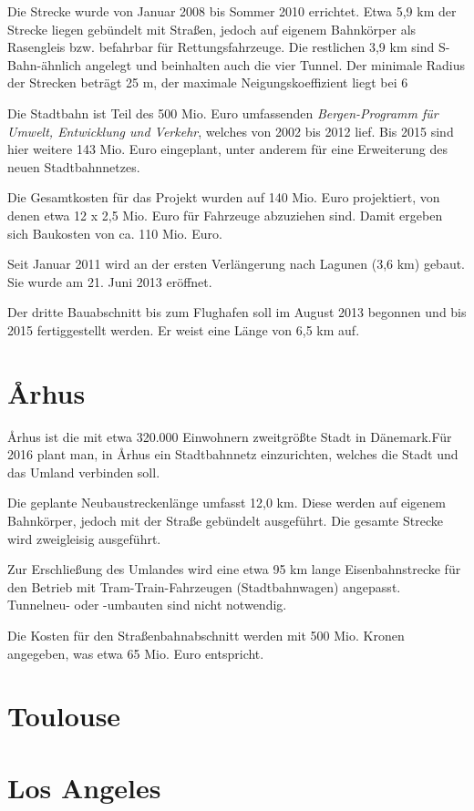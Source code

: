 Die Strecke wurde von Januar 2008 bis Sommer 2010 errichtet. Etwa 5,9 km der
Strecke liegen gebündelt mit Straßen, jedoch auf eigenem Bahnkörper als
Rasengleis bzw. befahrbar für Rettungsfahrzeuge. Die restlichen 3,9 km sind
S-Bahn-ähnlich angelegt und beinhalten auch die vier Tunnel. Der minimale Radius
der Strecken beträgt 25 m, der maximale Neigungskoeffizient liegt bei 6%

Die Stadtbahn ist Teil des 500 Mio. Euro umfassenden \emph{Bergen-Programm für
Umwelt, Entwicklung und Verkehr}, welches von 2002 bis 2012 lief. Bis 2015 sind
hier weitere 143 Mio. Euro eingeplant, unter anderem für eine Erweiterung des
neuen Stadtbahnnetzes.

Die Gesamtkosten für das Projekt wurden auf 140 Mio. Euro projektiert, von denen
etwa 12 x 2,5 Mio. Euro für Fahrzeuge abzuziehen sind. Damit ergeben sich
Baukosten von ca. 110 Mio. Euro.

Seit Januar 2011 wird an der ersten Verlängerung nach Lagunen (3,6 km)
gebaut. Sie wurde am 21. Juni 2013 eröffnet.

Der dritte Bauabschnitt bis zum Flughafen soll im August 2013 begonnen und bis
2015 fertiggestellt werden. Er weist eine Länge von 6,5 km auf.

\section{Århus}

Århus ist die mit etwa 320.000 Einwohnern zweitgrößte Stadt in Dänemark.Für 2016
plant man, in Århus ein Stadtbahnnetz einzurichten, welches die Stadt und das
Umland verbinden soll.

Die geplante Neubaustreckenlänge umfasst 12,0 km. Diese werden auf eigenem
Bahnkörper, jedoch mit der Straße gebündelt ausgeführt. Die gesamte Strecke wird
zweigleisig ausgeführt.

Zur Erschließung des Umlandes wird eine etwa 95 km lange Eisenbahnstrecke für
den Betrieb mit Tram-Train-Fahrzeugen (Stadtbahnwagen) angepasst. Tunnelneu-
oder -umbauten sind nicht notwendig.

Die Kosten für den Straßenbahnabschnitt werden mit 500 Mio. Kronen angegeben,
was etwa 65 Mio.  Euro entspricht.

\section{Toulouse}


\section{Los Angeles}


